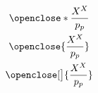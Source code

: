\documentclass[12pt, a4paper]{article}
\DeclarePairedDelimiter\openclose\lbrack\rangle
\begin{document}
\begin{gather*}
    \openclose*{\frac{X^X}{p_p}} \\
    \openclose{\frac{X^X}{p_p}} \\
    \openclose[\big]{\frac{X^X}{p_p}}
\end{gather*}
\end{document}
